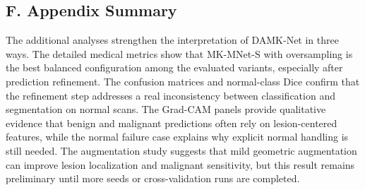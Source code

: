 \subsection*{F. Appendix Summary}

The additional analyses strengthen the interpretation of DAMK-Net in three ways. The detailed medical metrics show that MK-MNet-S with oversampling is the best balanced configuration among the evaluated variants, especially after prediction refinement. The confusion matrices and normal-class Dice confirm that the refinement step addresses a real inconsistency between classification and segmentation on normal scans. The Grad-CAM panels provide qualitative evidence that benign and malignant predictions often rely on lesion-centered features, while the normal failure case explains why explicit normal handling is still needed. The augmentation study suggests that mild geometric augmentation can improve lesion localization and malignant sensitivity, but this result remains preliminary until more seeds or cross-validation runs are completed.
